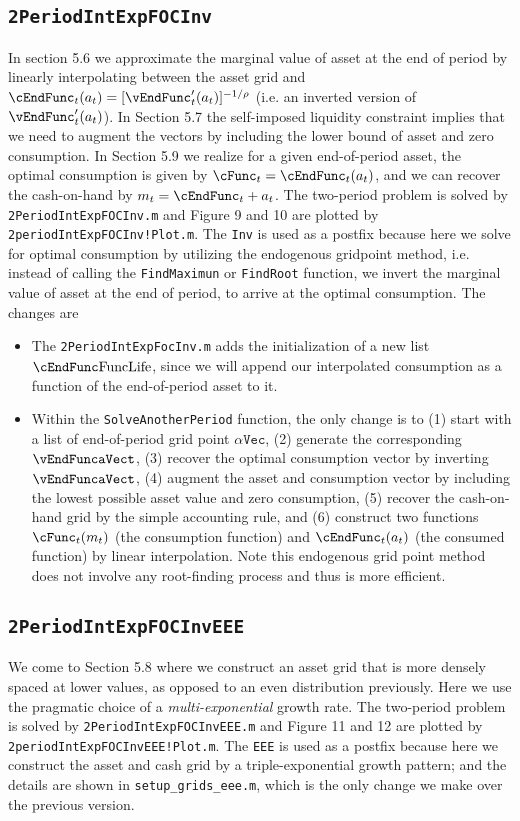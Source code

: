 \documentclass[titlepage,abstract]{\econtex}
\begin{document}
\subsection{\texttt{2PeriodIntExpFOCInv}}

In section 5.6 we approximate the marginal value of asset at the end of period by linearly interpolating between the asset grid and $\cEndFunc_{t}(a_{t})=[\vEndFunc_{t}'(a_{t})]^{-1/\rho}$ (i.e. an inverted version of $\vEndFunc_{t}'(a_{t})$). In Section 5.7 the self-imposed liquidity constraint implies that we need to augment the vectors by including the lower bound of asset and zero consumption. In Section 5.9 we realize for a given end-of-period asset, the optimal consumption is given by $\cFunc_{t}=\cEndFunc_{t}(a_{t})$, and we can recover the cash-on-hand by $m_{t}=\cEndFunc_{t} + a_{t}$. The two-period problem is solved by \texttt{2PeriodIntExpFOCInv.m} and Figure 9 and 10 are plotted by \texttt{2periodIntExpFOCInv!Plot.m}. The \texttt{Inv} is used as a postfix because here we solve for optimal consumption by utilizing the endogenous gridpoint method, i.e. instead of calling the \texttt{FindMaximun} or \texttt{FindRoot} function, we invert the marginal value of asset at the end of period, to arrive at the optimal consumption.
The changes are
\begin{itemize}
\item The \texttt{2PeriodIntExpFocInv.m} adds the initialization of a new list $\cEndFunc\text{FuncLife}$, since we will append our interpolated consumption as a function of the end-of-period asset to it.
\item Within the \texttt{SolveAnotherPeriod} function, the only change is to (1) start with a list of end-of-period grid point $\alpha\texttt{Vec}$, (2) generate the corresponding $\vEndFunc\texttt{aVect}$, (3) recover the optimal consumption vector by inverting $\vEndFunc\texttt{aVect}$, (4) augment the asset and consumption vector by including the lowest possible asset value and zero consumption, (5) recover the cash-on-hand grid by the simple accounting rule, and (6) construct two functions $\cFunc_{t}(m_{t})$ (the consumption function) and $\cEndFunc_{t}(a_{t})$ (the consumed function) by linear interpolation. Note this endogenous grid point method does not involve any root-finding process and thus is more efficient.
\end{itemize}

\subsection{\texttt{2PeriodIntExpFOCInvEEE}}
We come to Section 5.8 where we construct an asset grid that is more densely spaced at lower values, as opposed to an even distribution previously. Here we use the pragmatic choice of a \textit{multi-exponential} growth rate. The two-period problem is solved by \texttt{2PeriodIntExpFOCInvEEE.m} and Figure 11 and 12 are plotted by \texttt{2periodIntExpFOCInvEEE!Plot.m}. The \texttt{EEE} is used as a postfix because here we construct the asset and cash grid by a triple-exponential growth pattern; and the details are shown in \texttt{setup\_grids\_eee.m}, which is the only change we make over the previous version.
\end{document}
